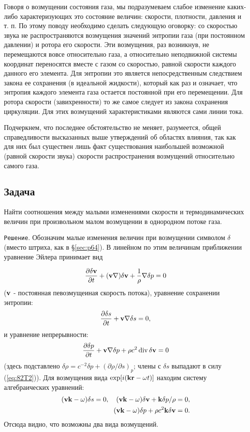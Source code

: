 Говоря о возмущении состояния газа, мы подразумеваем слабое изменение каких-либо характеризующих это состояние величин: скорости, плотности, давления и т. п.
По этому поводу необходимо сделать следующую оговорку: со скоростью звука не распространяются возмущения значений энтропии газа (при постоянном давлении) и ротора его скорости.
Эти возмущения, раз возникнув, не перемещаются вовсе относительно газа, а относительно неподвижной системы координат переносятся вместе с газом со скоростью, равной скорости каждого данного его элемента.
Для энтропии это является непосредственным следствием закона ее сохранения (в идеальной жидкости), который как раз и означает, что энтропия каждого элемента газа остается постоянной при его перемещении.
Для ротора скорости (завихренности) то же самое следует из закона сохранения циркуляции.
Для этих возмущений характеристиками являются сами линии тока.

Подчеркнем, что последнее обстоятельство не меняет, разумеется, общей справедливости высказанных выше утверждений об областях влияния, так как для них был существен лишь факт существования наибольшей возможной (равной скорости звука) скорости распространения возмущений относительно самого газа.

\subsection*{Задача}

Найти соотношения между малыми изменениями скорости и термодинамических величин при произвольном малом возмущении в однородном потоке газа.

\texttt{Решение}. Обозначим малые изменения величин при возмущении символом $\delta$ (вместо штриха, как в \S \ref{sec:p64}). В линейном по этим величинам приближении уравнение Эйлера принимает вид

\begin{equation}
    \label{eq:82T1}
    \frac{\partial{\delta  \mathbf{v} }}{\partial{t}} + (\mathbf{v} \nabla) \delta \mathbf{v} + \frac1{\rho} \nabla \delta p = 0
\end{equation}
($\mathbf{v}$ - постоянная певозмущеиная скорость потока), уравнение сохранении энтропии:
\begin{equation}
    \label{eq:82T2}
    \frac{\partial{\delta s}}{\partial{t}} + \mathbf{v} \nabla \delta s = 0,
\end{equation}
и уравнение непрерывности:
\begin{equation}
    \label{eq:82T3}
    \frac{\partial{\delta p}}{\partial{t}} + \mathbf{v} \nabla \delta p + \rho c^2 \mathop{\mathrm{div}}\nolimits \delta \mathbf{v} = 0
\end{equation}
(здесь подставлено $\delta \rho = c^{-2} \delta p + (\partial\rho/\partial s)_p$;
члены с $\delta s$ выпадают в силу (\ref{eq:82T2})).
Для возмущения вида $\exp [i(\mathbf{kr}-\omega t)]$ находим систему алгебраических уравнений:
\begin{eqnarray}
    (\mathbf{vk}-\omega)\delta s = 0,   \quad (\mathbf{vk}-\omega) \delta \mathbf{v} + \mathbf{k} \delta p/\rho = 0, \nonumber \\
    (\mathbf{vk}-\omega) \delta p + \rho c^2 \mathbf{k} \delta \mathbf{v} = 0.
\end{eqnarray} Отсюда видно, что возможны два вида возмущений.


